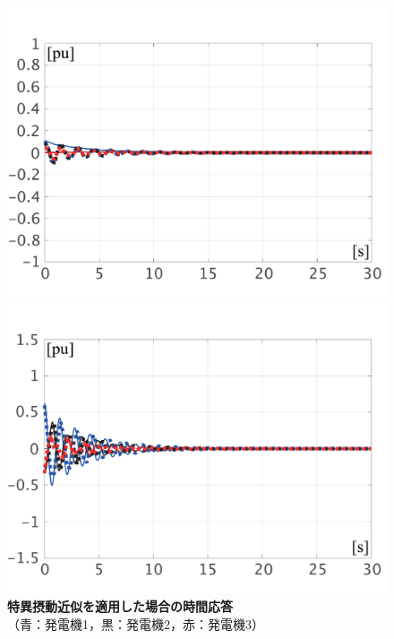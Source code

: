 \documentclass[tombow,dvipdfmx]{corona-a5-1.1}
\begin{document}
\begin{figure}[t]
{\begin{minipage}{0.49\linewidth}
    \centering
    \includegraphics[width = 1.0\linewidth]{figs/Espa}
    \medskip
  \end{minipage}
  \begin{minipage}{0.49\linewidth}
    \centering
    \includegraphics[width = 1.0\linewidth]{figs/Pspa}
    \medskip
  \end{minipage}
  }
  \medskip
  \caption{\textbf{特異摂動近似を適用した場合の時間応答}
  \\  \centering（青：発電機1，黒：発電機2，赤：発電機3）}
  \label{fig:timeexsp}
\medskip
\end{figure}
\end{document}
